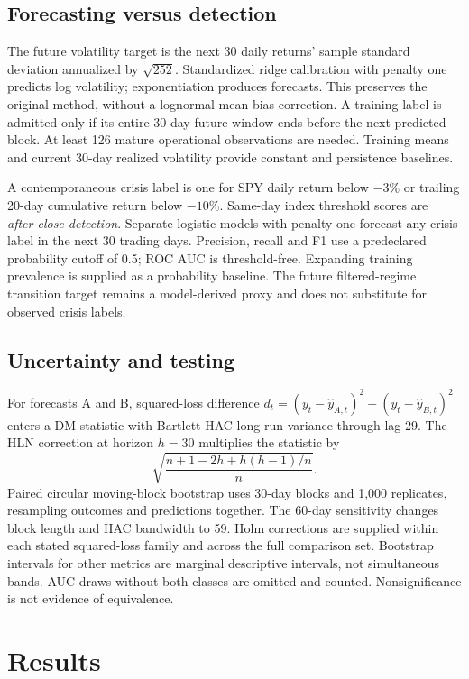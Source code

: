 \documentclass[11pt]{article}
\begin{document}
\subsection{Forecasting versus detection}
The future volatility target is the next 30 daily returns' sample standard deviation annualized by
$\sqrt{252}$. Standardized ridge calibration with penalty one predicts log volatility; exponentiation
produces forecasts. This preserves the original method, without a lognormal mean-bias correction.
A training label is admitted only if its entire 30-day future window ends before the next predicted
block. At least 126 mature operational observations are needed. Training means and current 30-day
realized volatility provide constant and persistence baselines.

A contemporaneous crisis label is one for SPY daily return below $-3\%$ or trailing 20-day cumulative
return below $-10\%$. Same-day index threshold scores are \emph{after-close detection}. Separate
logistic models with penalty one forecast any crisis label in the next 30 trading days. Precision,
recall and F1 use a predeclared probability cutoff of 0.5; ROC AUC is threshold-free. Expanding
training prevalence is supplied as a probability baseline. The future filtered-regime transition
target remains a model-derived proxy and does not substitute for observed crisis labels.

\subsection{Uncertainty and testing}
For forecasts A and B, squared-loss difference $d_t=(y_t-\hat y_{A,t})^2-(y_t-\hat y_{B,t})^2$
enters a DM statistic with Bartlett HAC long-run variance through lag 29. The HLN correction at
horizon $h=30$ multiplies the statistic by
\begin{equation}
\sqrt{\frac{n+1-2h+h(h-1)/n}{n}}.
\end{equation}
Paired circular moving-block bootstrap uses 30-day blocks and 1,000 replicates, resampling outcomes
and predictions together. The 60-day sensitivity changes block length and HAC bandwidth to 59.
Holm corrections are supplied within each stated squared-loss family and across the full comparison
set. Bootstrap intervals for other metrics are marginal descriptive intervals, not simultaneous bands.
AUC draws without both classes are omitted and counted. Nonsignificance is not evidence of equivalence.

\section{Results}
\end{document}
